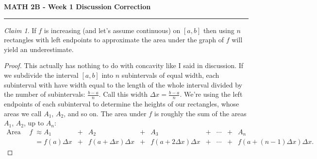 \documentclass[11pt,letterpaper]{report}
\theoremstyle{remark}
\newtheorem*{claim}{Claim}
\begin{document}
\begin{center}
{\bf \Large MATH 2B - Week 1 Discussion Correction} %
\vspace{0.2cm}
\hrule
\end{center}

\begin{claim}
	If $f$ is increasing (and let's assume continuous) on $[a,b]$ then using $n$ rectangles with left endpoints to approximate the area under the graph of $f$ will yield an underestimate.
\end{claim}
\begin{proof}
	This actually has nothing to do with concavity like I said in discussion. If we subdivide the interval $[a,b]$ into $n$ subintervals of equal width, each subinterval with have width equal to the length of the whole interval divided by the number of subintervals:  $\frac{b-a}{n}$. Call this width $\Delta x = \frac{b-a}{n}$. We're using the left endpoints of each subinterval to determine the heights of our rectangles, whose areas we call $A_1$, $A_2$, and so on. The area under $f$ is roughly the sum of the areas $A_1$, $A_2$, up to $A_n$:
	\begin{align*}
	\text{Area under $f$} &\approx A_1 &+& A_2 &+& A_3 &+& \cdots &+& A_n\\
	&= f(a)\Delta x &+& f(a + \Delta x)\Delta x &+& f(a + 2\Delta x)\Delta x &+& \cdots &+& f(a + (n-1)\Delta x)\Delta x.
	\end{align*}


\end{proof}
\end{document}

